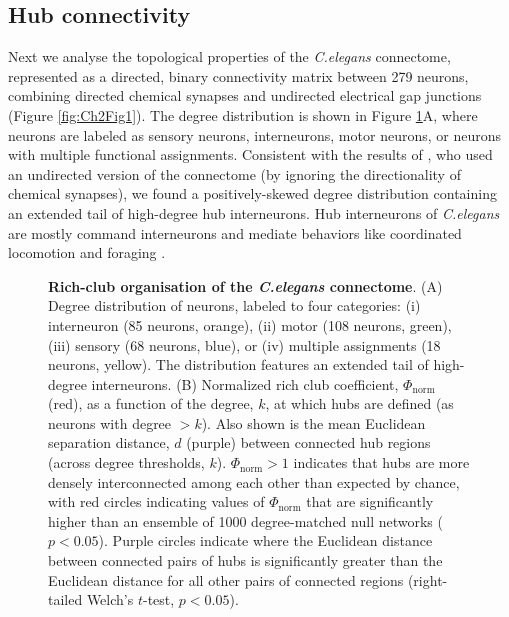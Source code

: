 \subsection{Hub connectivity}

Next we analyse the topological properties of the \emph{C.elegans} connectome, represented as a directed, binary connectivity matrix between 279 neurons, combining directed chemical synapses and undirected electrical gap junctions (Figure \ref{fig:Ch2Fig1}).
The degree distribution is shown in Figure \ref{fig:Ch2Fig5}A, where neurons are labeled as sensory neurons, interneurons, motor neurons, or neurons with multiple functional assignments.
Consistent with the results of \citet{Towlson2013},  who used an undirected version of the connectome (by ignoring the directionality of chemical synapses), we found a positively-skewed degree distribution containing an extended tail of high-degree hub interneurons.
Hub interneurons of \emph{C.elegans} are mostly command interneurons and mediate behaviors like coordinated locomotion and foraging \citep{Tsalik2003}.


\begin{figure}[!h]
 \caption{\textbf{Rich-club organisation of the \emph{C.elegans} connectome}.
(A) Degree distribution of neurons, labeled to four categories:
(i) interneuron (85 neurons, orange),
(ii) motor (108 neurons, green),
(iii) sensory (68 neurons, blue), or
(iv) multiple assignments (18 neurons, yellow).
The distribution features an extended tail of high-degree interneurons.
(B)
Normalized rich club coefficient, $\Phi_\mathrm{norm}$ (red), as a function of the degree, $k$, at which hubs are defined (as neurons with degree $>k$).
Also shown is the mean Euclidean separation distance, $d$ (purple) between connected hub regions (across degree thresholds, $k$).
$\Phi_\mathrm{norm} > 1$ indicates that hubs are more densely interconnected among each other than expected by chance, with red circles indicating values of $\Phi_\mathrm{norm}$ that are significantly higher than an ensemble of 1000 degree-matched null networks ($p < 0.05$).
Purple circles indicate where the Euclidean distance between connected pairs of hubs is significantly greater than the Euclidean distance for all other pairs of connected regions (right-tailed Welch's $t$-test, $p < 0.05$).
}
 \label{fig:Ch2Fig5}
\end{figure}

